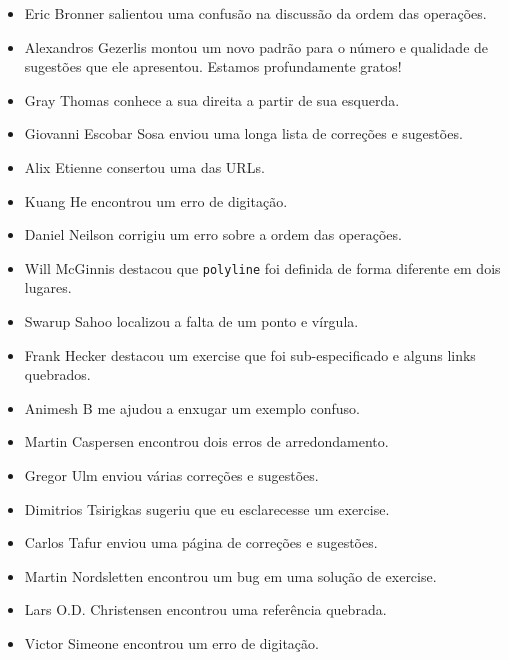 \documentclass[10pt]{book}
\begin{document}
\begin {itemize}
\item Eric Bronner salientou uma confusão na discussão da
ordem das operações.

\item Alexandros Gezerlis montou um novo padrão para o número e
qualidade de sugestões que ele apresentou. Estamos profundamente gratos!

\item Gray Thomas conhece a sua direita a partir de sua esquerda.

\item Giovanni Escobar Sosa enviou uma longa lista de correções e
sugestões.

\item Alix Etienne consertou uma das URLs.

\item Kuang He encontrou um erro de digitação.

\item Daniel Neilson corrigiu um erro sobre a ordem das operações.

\item Will McGinnis destacou que {\tt polyline} foi definida
de forma diferente em dois lugares.

\item Swarup Sahoo localizou a falta de um ponto e vírgula.

\item Frank Hecker destacou um exercise que foi sub-especificado e
alguns links quebrados.

\item Animesh B me ajudou a enxugar um exemplo confuso.

\item Martin Caspersen encontrou dois erros de arredondamento.

\item Gregor Ulm enviou várias correções e sugestões.

\item Dimitrios Tsirigkas sugeriu que eu esclarecesse um exercise.

\item Carlos Tafur enviou uma página de correções e sugestões.

\item Martin Nordsletten encontrou um bug em uma solução de exercise.

\item Lars O.D. Christensen encontrou uma referência quebrada.

\item Victor Simeone encontrou um erro de digitação.


\end{itemize}
\end{document}
